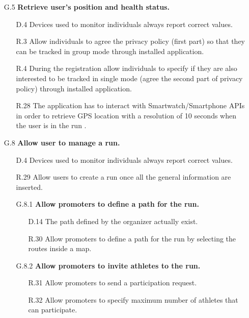 \begin{enumerate}
	\begin{enumerate}
	\item [G.5] \textbf{Retrieve user's position and health status.}
		\begin{enumerate}
		\item [D.4] Devices used to monitor individuals always report correct values.
		\item [R.3] Allow individuals to agree the privacy policy (first part) so that they can be tracked in group mode through installed application.  
		\item [R.4] During the registration allow individuals to specify if they are also interested to be tracked in single mode (agree the second part of privacy policy) through installed application. 
		\item [R.28] The application has to interact with Smartwatch/Smartphone APIs in order to retrieve GPS location with a resolution of 10 seconds when the user is in the run .
		\end{enumerate}
		
	\item [G.8] \textbf{Allow user to manage a run.}
		\begin{enumerate}
		\item [D.4] Devices used to monitor individuals always report correct values.
		\item [R.29] Allow users to create a run once all the general information are inserted.
			
		\item [G.8.1] \textbf{Allow promoters to define a path for the run.}
			\begin{enumerate}
			\item [D.14] The path defined by the organizer actually exist.
			\item [R.30] Allow promoters to define a path for the run by selecting the routes inside a map.
			\end{enumerate}
			
		\item [G.8.2] \textbf{Allow promoters to invite athletes to the run.}
			\begin{enumerate}
			\item [R.31] Allow promoters to send a participation request.
			\item [R.32] Allow promoters to specify maximum number of athletes that can participate.
			\end{enumerate}
	\end{enumerate}
	

\end{enumerate}
\end{enumerate}

